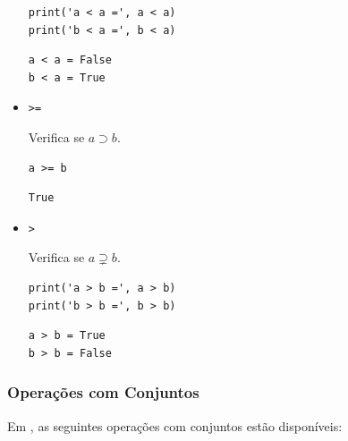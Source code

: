 \begin{itemize}
\begin{lstlisting}[xrightmargin=2.5em]
print('a < a =', a < a)
print('b < a =', b < a)
\end{lstlisting}

\begin{verbatim}
a < a = False
b < a = True  
\end{verbatim}

\item \lstinline+>=+ 

    Verifica se $a\supset b$.

\begin{lstlisting}[xrightmargin=2.5em]
a >= b
\end{lstlisting}

\begin{verbatim}
True
\end{verbatim}

\item \lstinline+>+ 

  Verifica se $a\supsetneq b$.
  
\begin{lstlisting}[xrightmargin=2.5em]
print('a > b =', a > b)
print('b > b =', b > b)
\end{lstlisting}

\begin{verbatim}
a > b = True
b > b = False
\end{verbatim}

\end{itemize}


\subsubsection{Operações com Conjuntos}

Em {\python}, as seguintes operações com conjuntos estão disponíveis:

